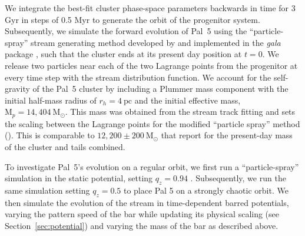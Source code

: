\documentclass[twocolumn]{aastex62}
\newcommand{\package}[1]{\textsl{#1}}
\newcommand{\msun}{\textrm{M}_\odot}
\newcommand{\ab}[1]{{\color{teal} AB: #1}}
\newcommand{\sa}[1]{{\color{magenta} SP: #1}}
\begin{document}
We integrate the best-fit cluster phase-space parameters backwards in time for 3 Gyr in steps of 0.5 Myr to generate the orbit of the progenitor system. %
Subsequently, we simulate the forward evolution of Pal~5 using the ``particle-spray'' stream generating method developed by \citet{Fardal:2015} and implemented in the \package{gala} package \citep{gala}, such that the cluster ends at its present day position at $t = 0$.
We release two particles near each of the two Lagrange points from the progenitor at every time step with the \citet{Fardal:2015} stream distribution function. %
We account for the self-gravity of the Pal~5 cluster by including a Plummer mass component with the initial half-mass radius of $r_h = 4~\textrm{pc}$ and the initial effective mass, $\textrm{M}_p = 14,404~\msun$.
This mass was obtained from the stream track fitting and sets the scaling between the Lagrange points for the modified ``particle spray'' method (\citealt{Fardal:2015}).
This is comparable to $12,200 \pm 200~\msun$ that \citet{Ibata:2017} report for the present-day mass of the cluster and tails combined.

To investigate Pal~5's evolution on a regular orbit, we first run a ``particle-spray'' simulation in the static potential, setting $q_z = 0.94$ \citep{Bovy:2016}.
Subsequently, we run the same simulation setting $q_z = 0.5$ to place Pal 5 on a strongly chaotic orbit.
We then simulate the evolution of the stream in time-dependent barred potentials, varying the pattern speed of the bar while updating its physical scaling (see Section~\ref{sec:potential}) and varying the mass of the bar as described above.
\end{document}
